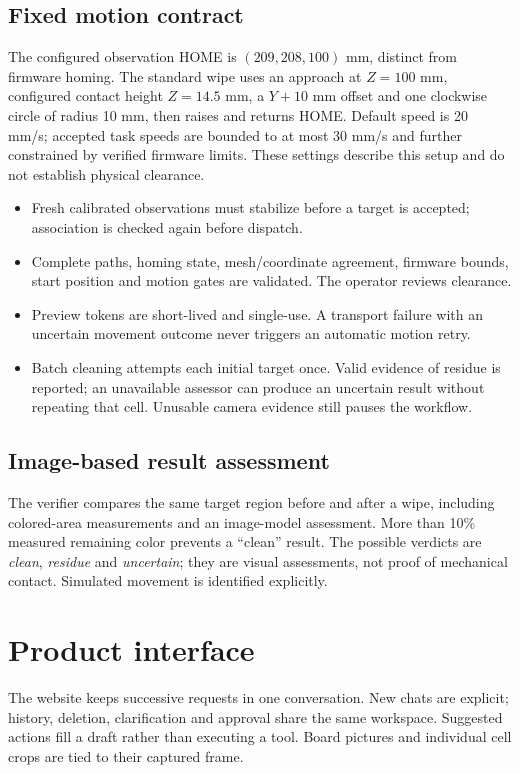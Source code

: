 \documentclass[10pt,a4paper]{article}
\begin{document}
\subsection{Fixed motion contract}
The configured observation HOME is $(209,208,100)$ mm, distinct from firmware
homing. The standard wipe uses an approach at $Z=100$ mm, configured contact
height $Z=14.5$ mm, a $Y+10$ mm offset and one clockwise circle of radius 10 mm,
then raises and returns HOME. Default speed is 20 mm/s; accepted task speeds are
bounded to at most 30 mm/s and further constrained by verified firmware limits.
These settings describe this setup and do not establish physical clearance.

\begin{itemize}
\item Fresh calibrated observations must stabilize before a target is accepted;
association is checked again before dispatch.
\item Complete paths, homing state, mesh/coordinate agreement, firmware bounds,
start position and motion gates are validated. The operator reviews clearance.
\item Preview tokens are short-lived and single-use. A transport failure with an
uncertain movement outcome never triggers an automatic motion retry.
\item Batch cleaning attempts each initial target once. Valid evidence of residue
is reported; an unavailable assessor can produce an uncertain result without
repeating that cell. Unusable camera evidence still pauses the workflow.
\end{itemize}

\subsection{Image-based result assessment}
The verifier compares the same target region before and after a wipe, including
colored-area measurements and an image-model assessment. More than 10\% measured
remaining color prevents a ``clean'' result. The possible verdicts are
\textit{clean}, \textit{residue} and \textit{uncertain}; they are visual assessments,
not proof of mechanical contact. Simulated movement is identified explicitly.

\newpage
\section{Product interface}
The website keeps successive requests in one conversation. New chats are explicit;
history, deletion, clarification and approval share the same workspace. Suggested
actions fill a draft rather than executing a tool. Board pictures and individual
cell crops are tied to their captured frame.
\end{document}
